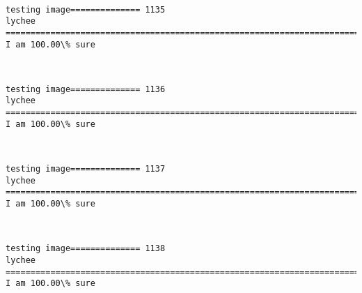 \documentclass[11pt]{article}
\begin{document}
    \begin{center}
    \end{center}
    { \hspace*{\fill} \\}
    
    \begin{Verbatim}[commandchars=\\\{\}]
testing image============== 1135
lychee
============================================================================
I am 100.00\% sure

    \end{Verbatim}

    \begin{center}
    \end{center}
    { \hspace*{\fill} \\}
    
    \begin{Verbatim}[commandchars=\\\{\}]
testing image============== 1136
lychee
============================================================================
I am 100.00\% sure

    \end{Verbatim}

    \begin{center}
    \end{center}
    { \hspace*{\fill} \\}
    
    \begin{Verbatim}[commandchars=\\\{\}]
testing image============== 1137
lychee
============================================================================
I am 100.00\% sure

    \end{Verbatim}

    \begin{center}
    \end{center}
    { \hspace*{\fill} \\}
    
    \begin{Verbatim}[commandchars=\\\{\}]
testing image============== 1138
lychee
============================================================================
I am 100.00\% sure

    \end{Verbatim}
\end{document}
